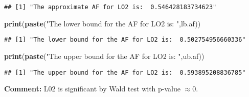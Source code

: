\documentclass[]{article}
\newenvironment{Shaded}{\begin{snugshade}}{\end{snugshade}}
\newcommand{\CommentTok}[1]{\textcolor[rgb]{0.56,0.35,0.01}{\textit{#1}}}
\newcommand{\DecValTok}[1]{\textcolor[rgb]{0.00,0.00,0.81}{#1}}
\newcommand{\FloatTok}[1]{\textcolor[rgb]{0.00,0.00,0.81}{#1}}
\newcommand{\KeywordTok}[1]{\textcolor[rgb]{0.13,0.29,0.53}{\textbf{#1}}}
\newcommand{\NormalTok}[1]{#1}
\newcommand{\OperatorTok}[1]{\textcolor[rgb]{0.81,0.36,0.00}{\textbf{#1}}}
\newcommand{\StringTok}[1]{\textcolor[rgb]{0.31,0.60,0.02}{#1}}
\begin{document}
\begin{Shaded}
\end{Shaded}

\begin{verbatim}
## [1] "The approximate AF for LO2 is:  0.546428183734623"
\end{verbatim}

\begin{Shaded}
\begin{Highlighting}[]
\KeywordTok{print}\NormalTok{(}\KeywordTok{paste}\NormalTok{(}\StringTok{"The lower bound for the AF for LO2 is: "}\NormalTok{,lb.af))}
\end{Highlighting}
\end{Shaded}

\begin{verbatim}
## [1] "The lower bound for the AF for LO2 is:  0.502754956660336"
\end{verbatim}

\begin{Shaded}
\begin{Highlighting}[]
\KeywordTok{print}\NormalTok{(}\KeywordTok{paste}\NormalTok{(}\StringTok{"The upper bound for the AF for LO2 is: "}\NormalTok{,ub.af))}
\end{Highlighting}
\end{Shaded}

\begin{verbatim}
## [1] "The upper bound for the AF for LO2 is:  0.593895208836785"
\end{verbatim}

\textbf{Comment:} L02 is significant by Wald test with p-value
\(\approx 0\).
\end{document}
